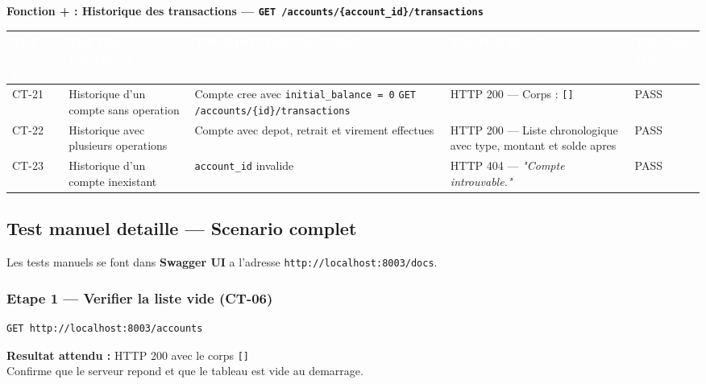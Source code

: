 \documentclass[12pt,a4paper]{article}
\begin{document}
\vspace{0.2cm}
{\bfseries\textcolor{danger}{Fonction + : Historique des transactions --- \texttt{GET /accounts/\{account\_id\}/transactions}}}
\vspace{0.1cm}

\begin{longtable}{|L{1.6cm}|L{3.8cm}|L{5.2cm}|L{4.2cm}|L{1.8cm}|}
\hline
{}
\textbf{\textcolor{white}{Test Case ID}} & \textbf{\textcolor{white}{Test Case Description}} & \textbf{\textcolor{white}{Test Input (Test Case Value)}} & \textbf{\textcolor{white}{Expected Results}} & \textbf{\textcolor{white}{Test Case Status}} \\
\hline
CT-21 & Historique d'un compte sans operation & Compte cree avec \texttt{initial\_balance = 0} \newline \texttt{GET /accounts/\{id\}/transactions} & HTTP 200 --- Corps : \texttt{[]} & PASS \\
\hline
{}
CT-22 & Historique avec plusieurs operations & Compte avec depot, retrait et virement effectues & HTTP 200 --- Liste chronologique avec type, montant et solde apres & PASS \\
\hline
CT-23 & Historique d'un compte inexistant & \texttt{account\_id} invalide & HTTP 404 --- \textit{"Compte introuvable."} & PASS \\
\hline
\end{longtable}

\subsection{Test manuel detaille --- Scenario complet}

Les tests manuels se font dans \textbf{Swagger UI} a l'adresse \texttt{http://localhost:8003/docs}.

\subsubsection{Etape 1 --- Verifier la liste vide (CT-06)}

\begin{lstlisting}[style=bash, caption={Requete GET /accounts}]
GET http://localhost:8003/accounts
\end{lstlisting}

\begin{successbox}
\textbf{Resultat attendu :} HTTP 200 avec le corps \texttt{[]}\\
Confirme que le serveur repond et que le tableau est vide au demarrage.
\end{successbox}
\end{document}
